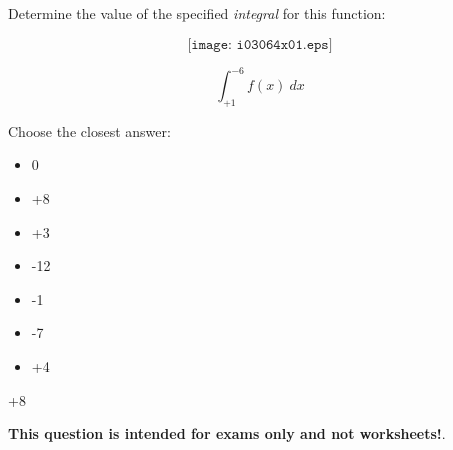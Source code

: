 

Determine the value of the specified {\it integral} for this function:

$$\texttt{[image: i03064x01.eps]}$$

$$\int_{+1}^{-6} f(x) \> dx$$

Choose the closest answer:

\begin{itemize}
\item{} 0
\vskip 10pt 
\item{} +8
\vskip 10pt 
\item{} +3
\vskip 10pt 
\item{} -12
\vskip 10pt 
\item{} -1
\vskip 10pt 
\item{} -7
\vskip 10pt 
\item{} +4
\end{itemize}








+8






{\bf This question is intended for exams only and not worksheets!}.



